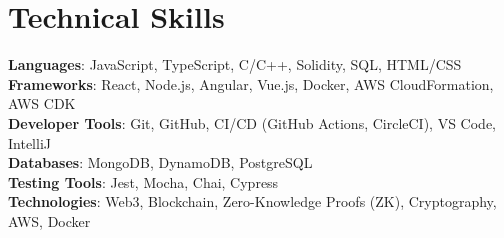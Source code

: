 \section{Technical Skills}
 \begin{itemize}[leftmargin=0.15in, label={}]
    \small{\item{
     \textbf{Languages}{: JavaScript, TypeScript, C/C++, Solidity, SQL, HTML/CSS} \\
     \textbf{Frameworks}{: React, Node.js, Angular, Vue.js, Docker, AWS CloudFormation, AWS CDK} \\
     \textbf{Developer Tools}{: Git, GitHub, CI/CD (GitHub Actions, CircleCI), VS Code, IntelliJ} \\
     \textbf{Databases}{: MongoDB, DynamoDB, PostgreSQL} \\
     \textbf{Testing Tools}{: Jest, Mocha, Chai, Cypress} \\
     \textbf{Technologies}{: Web3, Blockchain, Zero-Knowledge Proofs (ZK), Cryptography, AWS, Docker}
    }}
 \end{itemize}
